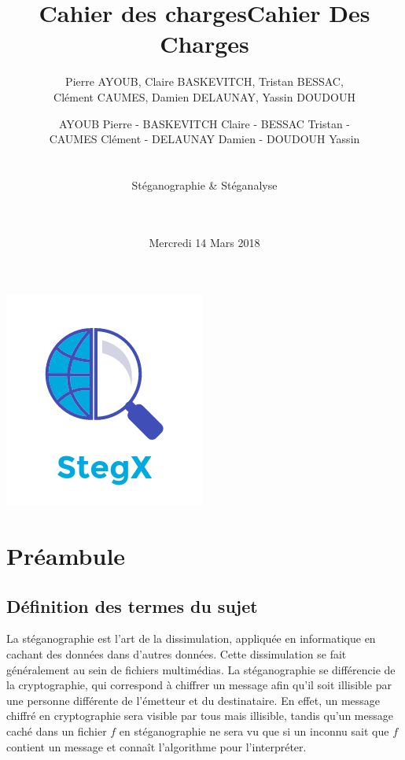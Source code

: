 \documentclass[11pt]{article}
\title{Cahier des charges}
\author{Pierre AYOUB, Claire BASKEVITCH, Tristan BESSAC, \\
Clément CAUMES, Damien DELAUNAY, Yassin DOUDOUH}
\date{Mercredi 14 Mars 2018}
\begin{document}
\title{\Huge{\textbf{Cahier Des Charges}}}
	\author{AYOUB Pierre - BASKEVITCH Claire - BESSAC Tristan - \\
		CAUMES Clément - DELAUNAY Damien - DOUDOUH Yassin \\ \\ \\
		Stéganographie \& Stéganalyse \\ \\ \\}
		

	\begin{titlepage}
		\maketitle
		\vspace{20em}
		\begin{center}\includegraphics{application.png}\end{center}
	\end{titlepage}

\section{Préambule}

\subsection{Définition des termes du sujet}
La stéganographie est l'art de la dissimulation, appliquée en informatique en
cachant des données dans d'autres données. Cette dissimulation se fait
généralement au sein de fichiers multimédias. 
La stéganographie se différencie de la cryptographie, qui correspond à chiffrer un message afin qu'il soit illisible par une personne différente de l'émetteur 
et du destinataire. 
En effet, un message chiffré en cryptographie sera visible par tous mais illisible, tandis qu'un message caché dans un fichier $f$ en stéganographie ne sera vu que si un inconnu sait que $f$ contient un message et connaît l'algorithme pour l'interpréter. 
\end{document}
